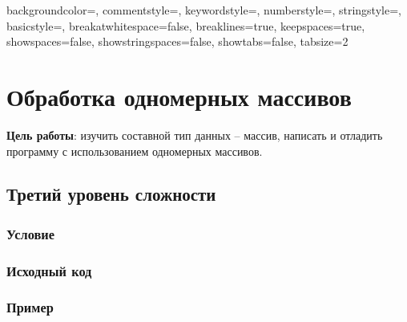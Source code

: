 
\usepackage{listings}
\usepackage{xcolor}


 {
    backgroundcolor=\color{backcolour}, commentstyle=\color{codegreen},
    keywordstyle=\color{codeblue},
    numberstyle=\tiny\color{codegray},
    stringstyle=\color{codeblue},
    basicstyle=\ttfamily\footnotesize,
    breakatwhitespace=false,         
    breaklines=true,                   
    keepspaces=true,             
    showspaces=false,                
    showstringspaces=false,
    showtabs=false,                  
    tabsize=2
}

\lstset{style=mystyle}





\section{Обработка одномерных массивов}

\textbf{Цель работы}: изучить составной тип данных – массив, написать и 
отладить программу с использованием одномерных массивов.

\subsection{Третий уровень сложности}

\subsubsection{Условие}



\subsubsection{Исходный код}


\subsubsection{Пример}



